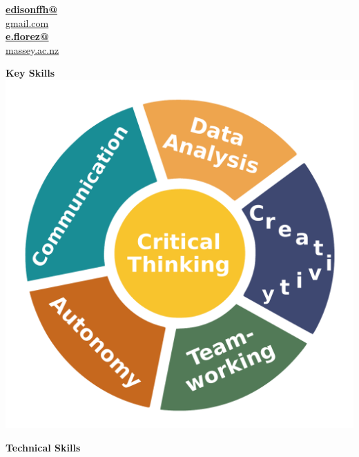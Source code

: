 \documentclass[12pt]{extarticle}
\begin{document}
\begin{minipage}{0.32\columnwidth}
\begin{flushright}
    \href{mailto:edisonffh@gmail.com}{\textbf{edisonffh@}\\[-1mm]gmail.com}\\ 
    \href{mailto:e.florez@massey.ac.nz}{\textbf{e.florez@}\\[-2mm]massey.ac.nz}\\
    \vspace*{6mm}

  \textcolor{azul}{\bf\Large Key Skills}\\ %
   \includegraphics[scale=0.3]{img/skills1.pdf}\\
      \vspace*{4mm}

% 

  \textcolor{azul}{\bf\Large Technical Skills}\\ \vspace*{4mm}


\end{flushright}
\end{minipage}
\end{document}
